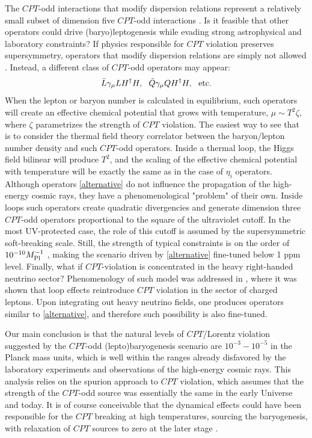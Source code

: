 \documentclass[12pt]{revtex4}
\begin{document}
	
	The $CPT$-odd interactions that modify dispersion relations 
	represent a relatively small subset of dimension five $CPT$-odd interactions \cite{BP}. 
	Is it feasible that other operators could  drive (baryo)leptogenesis while 
evading strong astrophysical and laboratory constraints? If physics responsible for $CPT$ violation 
preserves supersymmetry, operators that modify dispersion relations are simply not allowed 
\cite{GrootNibbelink:2004za,Bolokhov:2005cj}. Instead, a different class of $CPT$-odd operators may appear: 
\begin{equation}
\bar L \gamma_\mu L H^\dagger H,~~\bar Q \gamma_\mu Q H^\dagger H, ~~{\rm etc}. 
\label{alternative}
\end{equation}
When the lepton or 
baryon number is calculated in equilibrium, such operators will create an 
effective chemical potential that grows with temperature, $\mu \sim T^2\zeta$, where 
$\zeta$ parametrizes the strength of $CPT$ violation. The easiest way to see that is to 
consider the thermal field theory correlator between the baryon/lepton number density and 
such $CPT$-odd operators. Inside a thermal loop, the Higgs field bilinear will produce $T^2$,
and the scaling of the effective chemical potential with temperature will be exactly the 
same as in the case of $\eta_i$ operators. Although operators \eqref{alternative} do not influence 
the propagation of the high-energy cosmic rays, they have a phenomenological "problem" of their own. 
Inside loops such operators create quadratic divergencies and generate dimension three $CPT$-odd 
operators proportional to the square of the ultraviolet cutoff. In the most UV-protected case, 
the role of this cutoff is assumed by the supersymmetric soft-breaking scale. Still, the strength
of typical constraints is on the order of $10^{-10}M_{\rm Pl}^{-1}$ 
\cite{Bolokhov:2005cj}, making the 
scenario driven by \eqref{alternative} fine-tuned below 1 ppm level. 
Finally, what if $CPT$-violation is concentrated in the heavy right-handed neutrino sector? 
Phenomenology of such model was addressed in \cite{Mocioiu:2002pz}, where it was shown that 
loop effects reintroduce $CPT$ violation in the sector of charged leptons. 
Upon integrating out heavy neutrino 
fields, one produces operators similar to \eqref{alternative}, and therefore 
such possibility is also fine-tuned. 

Our main conclusion is that the natural levels of $CPT$/Lorentz violation 
suggested by the $CPT$-odd (lepto)baryogenesis scenario are $10^{-3}-10^{-5}$
in the Planck mass units, which is well within the ranges already disfavored by the laboratory experiments 
and observations of the 
high-energy cosmic rays. This analysis 
relies on the spurion approach to $CPT$ violation, which assumes that the strength of the 
$CPT$-odd source was essentially the same in the early Universe and today. 
It is of course conceivable that the dynamical effects could have been responsible for the 
$CPT$ breaking at high temperatures, sourcing the baryogenesis, with relaxation of $CPT$ sources to zero 
at the later stage \cite{Cohen:1987vi}.
\end{document}
